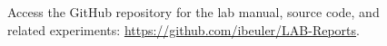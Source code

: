 \documentclass[journal]{IEEEtran}
\begin{document}
\begin{figure}[H]
    \centering
    \begin{minipage}{0.15\textwidth}
        \centering
    \end{minipage}%
    \begin{minipage}{0.2\textwidth}
        \raggedright
        \caption{Access the GitHub repository for the lab manual, source code, and related experiments: \href{https://github.com/ibeuler/LAB-Reports}{\url{https://github.com/ibeuler/LAB-Reports}}.}
    \end{minipage}
    \label{fig:qr}
\end{figure}
\end{document}
